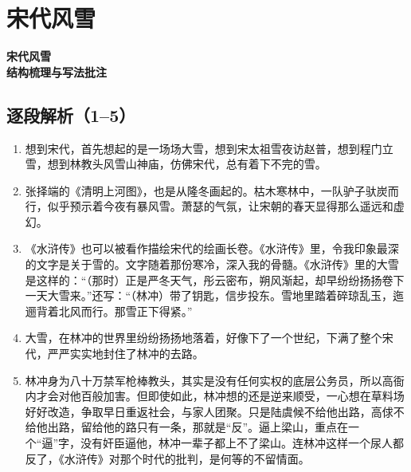 \chapter{宋代风雪}


\vspace{0.4cm}

\begin{center}
\Large\bfseries 宋代风雪\\[0.25em]
{\small\color{black!55} 结构梳理与写法批注}
\end{center}

\vspace{0.3cm}

\begin{handoutlayout}

\section*{逐段解析（1--5）}

\begin{enumerate}[leftmargin=*,label=\protect\circnum{\arabic*},labelsep=0.8em,itemsep=0.9em]

\item 想到宋代，首先想起的是一场场大雪，想到宋太祖雪夜访赵普，想到程门立雪，想到林教头风雪山神庙，仿佛宋代，总有着下不完的雪。

\item 张择端的《清明上河图》，也是从隆冬画起的。枯木寒林中，一队驴子驮炭而行，似乎预示着今夜有暴风雪。萧瑟的气氛，让宋朝的春天显得那么遥远和虚幻。

\item 《水浒传》也可以被看作描绘宋代的绘画长卷。《水浒传》里，令我印象最深的文字是关于雪的。文字随着那份寒冷，深入我的骨髓。《水浒传》里的大雪是这样的：“（那时）正是严冬天气，彤云密布，朔风渐起，却早纷纷扬扬卷下一天大雪来。”还写：“（林冲）带了钥匙，信步投东。雪地里踏着碎琼乱玉，迤逦背着北风而行。那雪正下得紧。”

\item 大雪，在林冲的世界里纷纷扬扬地落着，好像下了一个世纪，下满了整个宋代，严严实实地封住了林冲的去路。

\item 林冲身为八十万禁军枪棒教头，其实是没有任何实权的底层公务员，所以高衙内才会对他百般加害。但即使如此，林冲想的还是逆来顺受，一心想在草料场好好改造，争取早日重返社会，与家人团聚。只是陆虞候不给他出路，高俅不给他出路，留给他的路只有一条，那就是“反”。逼上梁山，重点在一个“逼”字，没有奸臣逼他，林冲一辈子都上不了梁山。连林冲这样一个尿人都反了，《水浒传》对那个时代的批判，是何等的不留情面。


\end{enumerate}
\end{handoutlayout}
